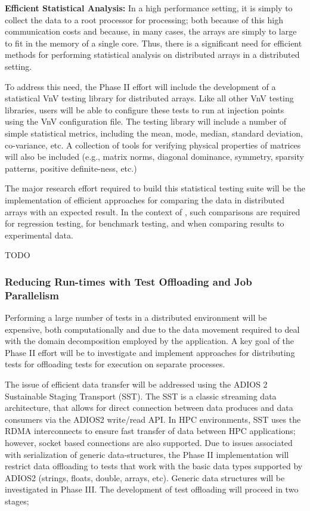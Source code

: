{\bf Efficient Statistical Analysis:} In a high performance setting, it is simply to collect the data to a root processor for processing; both because of this high communication costs and because, in many cases, the arrays are simply to large to fit in the memory of a single core. Thus, there is a significant need for efficient methods for performing statistical analysis on distributed arrays in a distributed setting. 

To address this need, the Phase II effort will include the development of a statistical VnV testing library for distributed arrays. Like all other VnV testing libraries, users will be able to configure these tests to run at injection points using the VnV configuration file. The testing library will include a number of simple statistical metrics, including the mean, mode, median, standard deviation, co-variance, etc. A collection of tools for verifying physical properties of matrices will also be included (e.g., matrix norms, diagonal dominance, symmetry, sparsity patterns, positive definite-ness, etc.) 

The major research effort required to build this statistical testing suite will be the implementation of efficient approaches for comparing the data in distributed arrays with an expected result. In the context of \VV, such comparisons are required for regression testing, for benchmark testing, and when comparing results to experimental data. 

TODO 

\subsubsection{Reducing Run-times with Test Offloading and Job Parallelism}

Performing a large number of \VV tests in a distributed environment will be expensive, both computationally and due to the data movement required to deal with the domain decomposition employed by the application. A key goal of the Phase II effort will be to investigate and implement approaches for distributing tests for offloading tests for execution on separate processes. 

The issue of efficient data transfer will be addressed using the ADIOS 2 Sustainable Staging Transport (SST). The SST is a classic streaming data architecture, that allows for direct connection between data produces and data consumers via the ADIOS2 write/read API. In HPC environments, SST uses the RDMA interconnects to ensure fast transfer of data between HPC applications; however, socket based connections are also supported. Due to issues associated with serialization of generic data-structures, the Phase II implementation will restrict data offloading to tests that work with the basic data types supported by ADIOS2 (strings, floats, double, arrays, etc). Generic data structures will be investigated in Phase III. The development of test offloading will proceed in two stages; 

